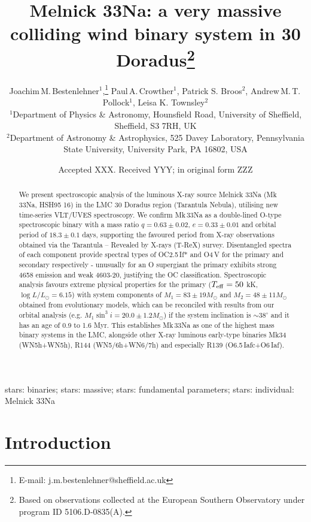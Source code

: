 \documentclass[fleqn,usenatbib]{mnras}
\title[Mk\,33Na: a very massive colliding wind binary]{Melnick 33Na: a very massive colliding wind binary system in 30 Doradus\thanks{Based on observations collected at the European Southern Observatory under program ID 5106.D-0835(A).}}
\author[J. M. Bestenlehner et al.]{
Joachim\,M.\,Bestenlehner$^{1}$,\thanks{E-mail: j.m.bestenlehner@sheffield.ac.uk}
Paul\,A.\,Crowther$^{1}$,
Patrick S. Broos$^{2}$,
Andrew\,M.\,T.\,Pollock$^{1}$,
Leisa K. Townsley$^{2}$
\\
$^{1}$Department of Physics \& Astronomy, Hounsfield Road, University of Sheffield, Sheffield, S3 7RH, UK\\
$^{2}$Department of Astronomy \& Astrophysics, 525 Davey Laboratory, Pennsylvania State University, University Park, PA 16802, USA\\
}
\date{Accepted XXX. Received YYY; in original form ZZZ}
\begin{document}
\label{firstpage}
\pagerange{\pageref{firstpage}--\pageref{lastpage}}
\maketitle

\begin{abstract}
We present spectroscopic analysis of the luminous X-ray source Melnick 33Na (Mk\,33Na, HSH95 16) in the LMC 30 Doradus region (Tarantula Nebula), utilising new time-series VLT/UVES spectroscopy. We confirm Mk\,33Na as a double-lined O-type spectroscopic binary with a mass ratio $q = 0.63 \pm 0.02$, $e = 0.33 \pm 0.01$ and orbital period of $18.3 \pm 0.1$ days, supporting the favoured period from X-ray observations obtained via the Tarantula -- Revealed by X-rays (T-ReX) survey. Disentangled spectra of each component provide spectral types of OC2.5\,If* and O4\,V for the primary and secondary respectively - unusually for an O supergiant the primary exhibits strong \,4658 emission and weak  4603-20, justifying the OC classification. Spectroscopic analysis favours extreme physical properties for the primary ($T_{\rm eff} = 50$ kK, $\log L/L_{\odot} = 6.15$) with system components of $M_{1} = 83 \pm 19 M_{\odot}$ and $M_{2} = 48 \pm 11 M_{\odot}$ obtained from evolutionary models, which can be reconciled with results from our orbital analysis (e.g. $M_{1} \sin^3 i = 20.0 \pm 1.2 M_{\odot}$) if the system inclination is $\sim 38^{\circ}$ and it has an age of 0.9 to 1.6 Myr. This establishes Mk\,33Na as one of the highest mass binary systems in the LMC, alongside other X-ray luminous early-type binaries Mk34 (WN5h+WN5h), R144 (WN5/6h+WN6/7h) and especially R139 (O6.5\,Iafc+O6\,Iaf).
\end{abstract}

\begin{keywords}
stars: binaries; stars: massive; stars: fundamental parameters; stars: individual: Melnick 33Na
\end{keywords}



\section{Introduction}
\end{document}
